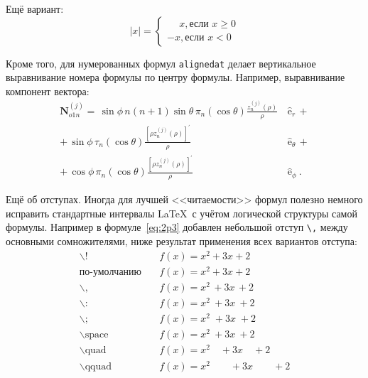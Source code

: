 Ещё вариант:
\[
    |x|=
    \begin{cases}
        \phantom{-}x, \text{если } x \geqslant 0 \\
        -x, \text{если } x<0
    \end{cases}
\]

Кроме того, для  нумерованных формул \verb|alignedat| делает вертикальное
выравнивание номера формулы по центру формулы. Например, выравнивание
компонент вектора:
\begin{equation}
    \label{eq:2p3}
    \begin{alignedat}{2}
        {\mathbf{N}}_{o1n}^{(j)} = \,{\sin} \phi\,n\!\left(n+1\right)
        {\sin}\theta\,
        \pi_n\!\left({\cos} \theta\right)
        \frac{
        z_n^{(j)}\!\left( \rho \right)
        }{\rho}\,
        &{\boldsymbol{\hat{\mathrm e}}}_{r}\,+   \\
        +\,
        {\sin} \phi\,
        \tau_n\!\left({\cos} \theta\right)
        \frac{
        \left[\rho z_n^{(j)}\!\left( \rho \right)\right]^{\prime}
        }{\rho}\,
        &{\boldsymbol{\hat{\mathrm e}}}_{\theta}\,+   \\
        +\,
        {\cos} \phi\,
        \pi_n\!\left({\cos} \theta\right)
        \frac{
        \left[\rho z_n^{(j)}\!\left( \rho \right)\right]^{\prime}
        }{\rho}\,
        &{\boldsymbol{\hat{\mathrm e}}}_{\phi}\:.
    \end{alignedat}
\end{equation}

Ещё об отступах. Иногда для лучшей <<читаемости>> формул полезно
немного исправить стандартные интервалы \LaTeX\ с учётом логической
структуры самой формулы. Например в формуле~\cref{eq:2p3} добавлен
небольшой отступ \verb+\,+ между основными сомножителями, ниже
результат применения всех вариантов отступа:
\begin{align*}
    \backslash!             & \quad f(x) = x^2\! +3x\! +2         \\
    \mbox{по-умолчанию}     & \quad f(x) = x^2+3x+2               \\
    \backslash,             & \quad f(x) = x^2\, +3x\, +2         \\
    \backslash{:}           & \quad f(x) = x^2\: +3x\: +2         \\
    \backslash;             & \quad f(x) = x^2\; +3x\; +2         \\
    \backslash \mbox{space} & \quad f(x) = x^2\ +3x\ +2           \\
    \backslash \mbox{quad}  & \quad f(x) = x^2\quad +3x\quad +2   \\
    \backslash \mbox{qquad} & \quad f(x) = x^2\qquad +3x\qquad +2
\end{align*}

